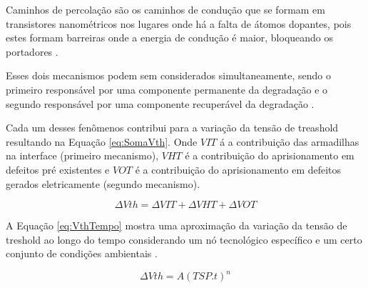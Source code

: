 


Caminhos de percolação são os caminhos de condução que se formam em transistores nanométricos nos lugares onde há a falta de átomos dopantes, pois estes formam barreiras onde a energia de condução é maior, bloqueando os portadores \cite{Ashraf}.


Esses dois mecanismos podem sem considerados simultaneamente, sendo o primeiro responsável por uma componente permanente da degradação e o segundo responsável por uma componente recuperável da degradação \cite{Banaszeski}.

Cada um desses fenômenos contribui para a variação da tensão de treashold resultando na Equação \ref{eq:SomaVth}. Onde $V\scriptstyle{IT}$ á a contribuição das armadilhas na interface (primeiro mecanismo), $V\scriptstyle{HT}$ é a contribuição do aprisionamento em defeitos pré existentes e $V\scriptstyle{OT}$ é a contribuição do aprisionamento em defeitos gerados eletricamente (segundo mecanismo).

\begin{equation}
    \label{eq:SomaVth}
    \Delta V{\scriptstyle {th}} = \Delta V{\scriptstyle {IT}} + \Delta V{\scriptstyle {HT}} + \Delta V{\scriptstyle {OT}}
\end{equation}

A Equação \ref{eq:VthTempo} mostra uma aproximação da variação da tensão de treshold ao longo do tempo considerando um nó tecnológico específico e um certo conjunto de condições ambientais \cite{Butzen}.

\begin{equation}
    \label{eq:VthTempo}
    \Delta Vth = A(TSP.t)^n
\end{equation}

